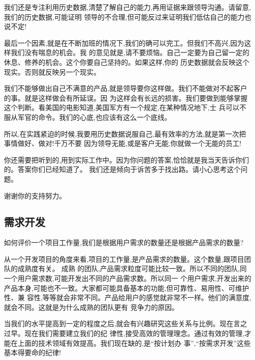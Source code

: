 \documentclass[11pt]{article}
\begin{document}
\begin{yang}
我们还是专注利用历史数据,清楚了解自己的能力,再用证据来跟领导沟通。请留意,我们的历史数据,可能证明
领导的不合理,但可能反过来证明我们低估自己的能力也说不定!

最后一个因素,就是在不断加班的情况下,我们的确可以完工。但我们不高兴,因为这样我们没有喘息的机会。我
的意见就是,请不要烦恼。自己一定要为自己留一定的休息、修养的机会。这个你要自己坚持的。如果这样,你的
历史数据就会反映这个现实。否则就反映另一个现实。

我们不能够做出自己不满意的产品,就是领导要你这样做。我们不能做对不起客户的事。就是这样做会有所延误。因
为这样会有长远的损害。我们要做到能够掌握这个判断。看美国的电影知道,美国军方有一个规定,在某种情况地下,士
兵可以不服从军官的命令。我们的心底,也应该有这么一个底线。

所以,在实践紧迫的时候,我要用历史数据说服自己,最有效率的方法,就是第一次把事情做好、做对!千万不要
因为领导无能,或是客户无能,你就做一个无能的员工!

你还需要把听到的,用到实际工作中。因为你问题的答案,恰恰就是我当天告诉你们的。答案你们已经知道了。
我们还是倾向于诉苦多于找出路。请小心思考这个问题。

谢谢你的支持努力。
\end{yang}

\subsection{需求开发}

\qlogo \begin{staff}
如何评价一个项目工作量,我们是根据用户需求的数量还是根据产品需求的数量?
\end{staff}

\begin{yang}

  \ylogo 从一个开发项目的角度来看,项目的工作量,是产品需求的数量。这个数量,跟项目团队的成熟度有关。 成熟
  的团队,产品需求粒度可能比较一致。所以不同的团队,同一个用户需求数,可能开发出不同的产品需求数。所以同一
  个用户需求,开发出来的产品本身,可能也不一致。大家都可能具备基本的功能,但可靠性、易用性、可维护性、兼
  容性,等等就会非常不同。产品给用户的感觉就非常不一样。他们的满意度,就会不同。这就是为什么成熟的团队更有
  竞争力的原因。

  当我们的水平提高到一定的程度之后,就会有兴趣研究这些关系与比例。现在言之过早。现在我们需要建立我们的纪
  律性,接受高效的管理理念。通过有效的管理,才能在上面的技术领域有效提高。我们现在缺的,是``按计划办
  事'',``按需求开发''这些基本得要命的纪律!
\end{yang}
\end{document}
